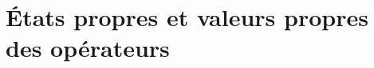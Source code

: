 \documentclass[xcolor=svgnames,t,aspectratio=169,handout]{uqtrcours}
\begin{document}
%
%
%
%
%
%
%
%



%
%
%
%



\section{États propres et valeurs propres des opérateurs}
\frame{\sectionpage}
\end{document}
